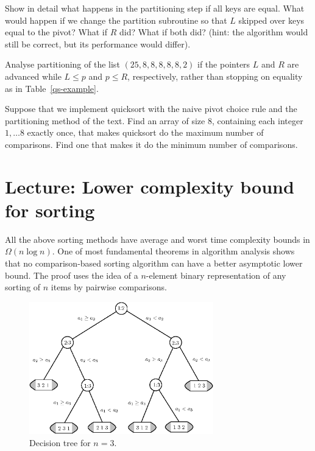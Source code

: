 \begin{Exercise}\label{exr:qs-equal-keys-partition}
Show in detail what happens in the partitioning step if all keys are equal. 
What would happen if we change the partition subroutine so that 
$L$ skipped over keys equal to the pivot? What if $R$ did? 
What if both did? (hint: the algorithm would still be correct, but its performance 
would differ).
\end{Exercise}

\begin{Exercise}\label{exr:qs-bad:partition}
Analyse partitioning of the list
$(25, 8, 8, 8, 8, 8, 2)$ if the pointers $L$ and $R$ are advanced
while \(L \le p\) and \(p \le R\), respectively, rather than stopping on 
equality as in Table~\ref{qs-example}.
\end{Exercise}

\begin{Exercise} \label{exr:quicksort-extremes}
Suppose that we implement quicksort with the naive pivot choice rule and the 
partitioning method of the text. Find an array of size 8, containing each 
integer $1, \dots 8$ exactly once, that makes quicksort do the maximum number 
of comparisons. Find one that makes it do the minimum number of comparisons.
\end{Exercise}



\chapter{Lecture: Lower complexity bound for sorting} \label{sec:lowerbound}
All the above sorting methods have average and worst time complexity bounds in 
$\Omega(n \log n)$. One of most fundamental theorems in algorithm analysis 
shows that no comparison-based sorting algorithm can have a better asymptotic 
lower bound. The proof uses the idea of a $n$-element binary 
 representation of any sorting of $n$ items by pairwise comparisons. 

\begin{figure}[htb!]
\centerline{
\includegraphics[width=80mm]{figs/tree123ipe.eps}
}
\caption{\label{tree123} Decision tree for $n=3$.}
\end{figure}

